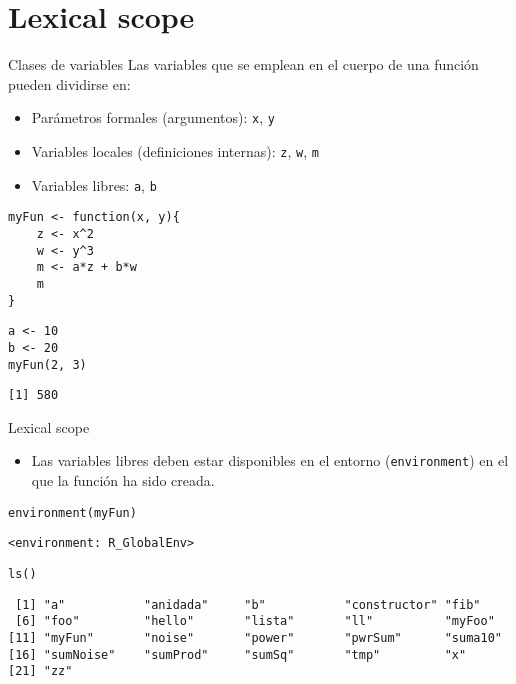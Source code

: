 \documentclass[xcolor={usenames,svgnames,dvipsnames}]{beamer}
\begin{document}
\section{Lexical scope}
\label{sec:orgheadline20}

\begin{frame}[fragile,label={sec:orgheadline14}]{Clases de variables}
 Las variables que se emplean en el cuerpo de una función pueden
dividirse en:
\begin{itemize}
\item Parámetros formales (argumentos): \texttt{x}, \texttt{y}
\item Variables locales (definiciones internas): \texttt{z}, \texttt{w}, \texttt{m}
\item Variables libres: \texttt{a}, \texttt{b}
\end{itemize}
\lstset{language=R,label= ,caption= ,captionpos=b,numbers=none}
\begin{lstlisting}
myFun <- function(x, y){
    z <- x^2
    w <- y^3
    m <- a*z + b*w
    m
}
\end{lstlisting}

\lstset{language=R,label= ,caption= ,captionpos=b,numbers=none}
\begin{lstlisting}
a <- 10
b <- 20
myFun(2, 3)
\end{lstlisting}

\begin{verbatim}
[1] 580
\end{verbatim}
\end{frame}

\begin{frame}[fragile,label={sec:orgheadline15}]{Lexical scope}
 \begin{itemize}
\item Las variables libres deben estar disponibles en el entorno
(\texttt{environment}) en el que la función ha sido creada.
\end{itemize}
\lstset{language=R,label= ,caption= ,captionpos=b,numbers=none}
\begin{lstlisting}
environment(myFun)
\end{lstlisting}

\begin{verbatim}
<environment: R_GlobalEnv>
\end{verbatim}

\lstset{language=R,label= ,caption= ,captionpos=b,numbers=none}
\begin{lstlisting}
ls()
\end{lstlisting}

\begin{verbatim}
 [1] "a"           "anidada"     "b"           "constructor" "fib"        
 [6] "foo"         "hello"       "lista"       "ll"          "myFoo"      
[11] "myFun"       "noise"       "power"       "pwrSum"      "suma10"     
[16] "sumNoise"    "sumProd"     "sumSq"       "tmp"         "x"          
[21] "zz"
\end{verbatim}
\end{frame}
\end{document}
